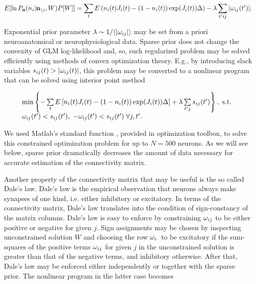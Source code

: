 \begin{equation}\label{eqn:likelihoodsparseGLM}
E[\ln P_{{\bf n}}(n_i|{\bf n}_{\backslash i}, W)P[W]]=\sum_t E\left( n_i(t) J_i(t) - (1-n_i(t)) \exp(J_i(t)) \Delta \right)-\lambda \sum_{t'ij}|\omega_{ij}(t')|.
\end{equation}

Exponential prior parameter $\lambda\sim 1/\langle|\omega_{ij}|\rangle$ may be set from a priori neuroanatomical or neurophysiological data. Sparse prior does not change the convexity of GLM log-likelihood and, so, such regularized problem may be solved efficiently using methods of convex optimization theory. E.g., by introducing slack variables $s_{ij}(t)>|\omega_{ij}(t)|$, this problem may be converted to a nonlinear program that can be solved using interior point method

\begin{equation} \label{eqn:conconvexopt}
\begin{array}{l}
\min \left\{-\sum\limits_t E\left[ n_i(t) J_i(t) - (1-n_i(t)) \exp(J_i(t)) \Delta \right]+\lambda \sum\limits_{t'j}s_{ij}(t')\right\}, \text{ s.t. } 
\\ \omega_{ij}(t')<s_{ij}(t'), \; -\omega_{ij}(t')<s_{ij}(t') \; \forall j, t'.
\end{array} 
\end{equation}

We used Matlab's standard function , provided in optimization toolbox, to solve this constrained optimization problem for up to $N=500$ neurons. As we will see below, sparse prior dramatically decreases the amount of data necessary for accurate estimation of the connectivity matrix.

Another property of the connectivity matrix that may be useful is the so called Dale's law. Dale's law is the empirical observation that neurons always make synapses of one kind, i.e. either inhibitory or excitatory. In terms of the connectivity matrix, Dale's law translates into the condition of sign-constancy of the matrix columns. Dale's law is easy to enforce by constraining $\omega_{ij}$ to be either positive or negative for given $j$.  Sign assignments may be chosen by inspecting unconstrained solution $W$ and choosing the row $\omega_{i \cdot}$ to be excitatory if the sum-squares of the positive terms $\omega_{ij}$ for given $j$ in the unconstrained solution is greater than that of the negative terms, and inhibitory otherwise.  After that, Dale's law may be enforced either independently or together with the sparse prior.  The nonlinear program in the latter case becomes

